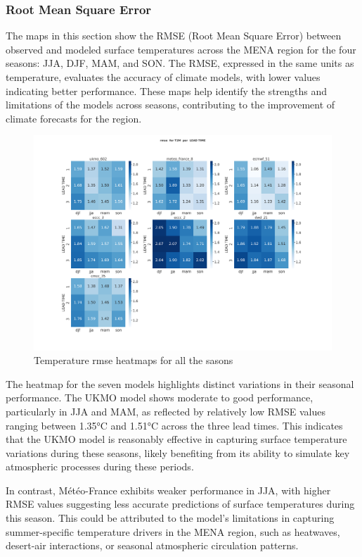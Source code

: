 \subsubsection{Root Mean Square Error}


The maps in this section show the RMSE (Root Mean Square Error) between observed and modeled surface temperatures across the MENA region for the four seasons: JJA, DJF, MAM, and SON. The RMSE, expressed in the same units as temperature, evaluates the accuracy of climate models, with lower values indicating better performance.  These maps help identify the strengths and limitations of the models across seasons, contributing to the improvement of climate forecasts for the region.
\begin{figure}[H]
    \centering
    \includegraphics[width=1\linewidth]{plots/det/rmse/rmse_T2M.png}
    \caption{Temperature rmse heatmaps for all the sasons}
\end{figure}

The heatmap for the seven models highlights distinct variations in their seasonal performance. The UKMO model shows moderate to good performance, particularly in JJA and MAM, as reflected by relatively low RMSE values ranging between 1.35°C and 1.51°C across the three lead times. This indicates that the UKMO model is reasonably effective in capturing surface temperature variations during these seasons, likely benefiting from its ability to simulate key atmospheric processes during these periods.

In contrast, Météo-France exhibits weaker performance in JJA, with higher RMSE values suggesting less accurate predictions of surface temperatures during this season. This could be attributed to the model's limitations in capturing summer-specific temperature drivers in the MENA region, such as heatwaves, desert-air interactions, or seasonal atmospheric circulation patterns.

